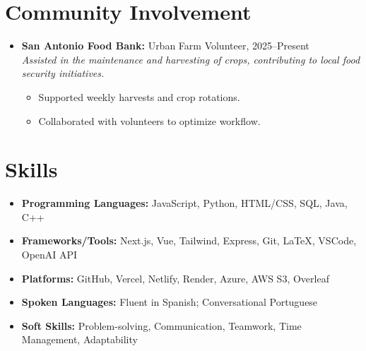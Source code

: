 \documentclass[letterpaper,10pt]{article}
\newcommand{\resumeItem}[1]{\item\hspace{5pt}\small{#1}}
\begin{document}
\section*{Community Involvement}
\begin{itemize}
  \item[] 
  \textbf{San Antonio Food Bank:} Urban Farm Volunteer, \hfill 2025–Present \\
  \textit{Assisted in the maintenance and harvesting of crops, contributing to local food security initiatives.}
  \begin{itemize}
    \resumeItem{Supported weekly harvests and crop rotations.}
    \resumeItem{Collaborated with volunteers to optimize workflow.}
  \end{itemize}
\end{itemize}

\section*{Skills}
\begin{itemize}
  \resumeItem{\textbf{Programming Languages:} JavaScript, Python, HTML/CSS, SQL, Java, C++}
  \resumeItem{\textbf{Frameworks/Tools:} Next.js, Vue, Tailwind, Express, Git, LaTeX, VSCode, OpenAI API}
  \resumeItem{\textbf{Platforms:} GitHub, Vercel, Netlify, Render, Azure, AWS S3, Overleaf}
  \resumeItem{\textbf{Spoken Languages:} Fluent in Spanish; Conversational Portuguese}
  \resumeItem{\textbf{Soft Skills:} Problem-solving, Communication, Teamwork, Time Management, Adaptability}
\end{itemize}
\end{document}
